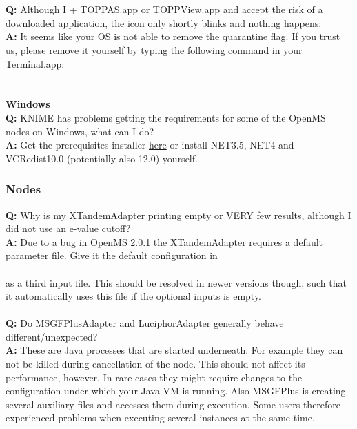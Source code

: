 \\\\
\textbf{Q:} Although I + TOPPAS.app or TOPPView.app and accept the risk of a downloaded application, the icon only shortly blinks and nothing happens:\\
\textbf{A:} It seems like your OS is not able to remove the quarantine flag. If you trust us, please remove it yourself by typing the following command in your Terminal.app:\\
\\\\
\textbf{Windows}\\
\textbf{Q:} KNIME has problems getting the requirements for some of the OpenMS nodes on Windows, what can I do?\\
\textbf{A:} Get the prerequisites installer \href{\WindowsPrerequisitesLink}{here} or install NET3.5, NET4 and VCRedist10.0 (potentially also 12.0) yourself.\\
\subsubsection{Nodes}
\textbf{Q:} Why is my XTandemAdapter printing empty or VERY few results, although I did not use an e-value cutoff?\\
\textbf{A:} Due to a bug in OpenMS 2.0.1 the XTandemAdapter requires a default parameter file. Give it the default configuration in\\
\\
 as a third input file. This should be resolved in newer versions though, such that it automatically uses this file if the optional inputs is empty.
\\\\
\textbf{Q:} Do MSGFPlusAdapter and LuciphorAdapter generally behave different/unexpected?\\
\textbf{A:} These are Java processes that are started underneath. For example they can not be killed during 
cancellation of the node.
This should not affect its performance, however. In rare cases they might require changes to the configuration under 
which your Java VM is running. Also MSGFPlus is creating several auxiliary files and accesses them during execution. 
Some users therefore experienced problems when executing several instances at the same time.
